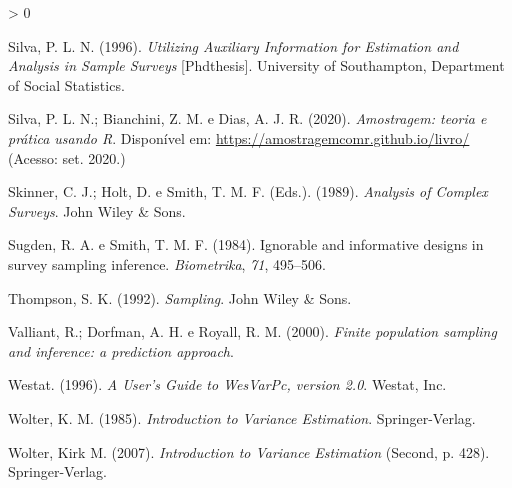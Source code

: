 \documentclass[
  12pt,
  brazilian,
]{book}
\newlength{\cslhangindent}
\newenvironment{CSLReferences}[2] %
 {%
  \setlength{\parindent}{0pt}
  \ifodd #1 \everypar{\setlength{\hangindent}{\cslhangindent}}\ignorespaces\fi
  \ifnum #2 > 0
  \setlength{\parskip}{#2\baselineskip}
  \fi
 }%
 {}
\theoremstyle{definition}
\theoremstyle{definition}
\theoremstyle{definition}
\theoremstyle{definition}
\theoremstyle{remark}
\begin{document}
\begin{CSLReferences}{1}{0}
\leavevmode\hypertarget{ref-Silva1996}{}%
Silva, P. L. N. (1996). \emph{Utilizing Auxiliary Information for Estimation and Analysis in Sample Surveys} {[}Phdthesis{]}. University of Southampton, Department of Social Statistics.

\leavevmode\hypertarget{ref-Silva2020}{}%
Silva, P. L. N.; Bianchini, Z. M. e Dias, A. J. R. (2020). \emph{{Amostragem: teoria e pr{á}tica usando R}}. Disponível em: \url{https://amostragemcomr.github.io/livro/} (Acesso: set. 2020.)

\leavevmode\hypertarget{ref-SHS89}{}%
Skinner, C. J.; Holt, D. e Smith, T. M. F. (Eds.). (1989). \emph{Analysis of Complex Surveys}. John Wiley \& Sons.

\leavevmode\hypertarget{ref-Sugden84}{}%
Sugden, R. A. e Smith, T. M. F. (1984). Ignorable and informative designs in survey sampling inference. \emph{Biometrika}, \emph{71}, 495--506.

\leavevmode\hypertarget{ref-thompson1992}{}%
Thompson, S. K. (1992). \emph{Sampling}. John Wiley \& Sons.

\leavevmode\hypertarget{ref-valliant2000}{}%
Valliant, R.; Dorfman, A. H. e Royall, R. M. (2000). \emph{Finite population sampling and inference: a prediction approach}.

\leavevmode\hypertarget{ref-Westat1996}{}%
Westat. (1996). \emph{A User's Guide to {WesVarPc}, version 2.0}. Westat, Inc.

\leavevmode\hypertarget{ref-Wolter1985}{}%
Wolter, K. M. (1985). \emph{Introduction to Variance Estimation}. Springer-Verlag.

\leavevmode\hypertarget{ref-Wolter2007}{}%
Wolter, Kirk M. (2007). \emph{Introduction to Variance Estimation} (Second, p. 428). Springer-Verlag.

\end{CSLReferences}
\end{document}

